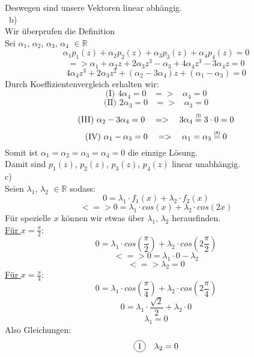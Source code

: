 \documentclass[11pt]{article}
\newcommand\myeqi{\mathrel{\overset{\makebox[0pt]{\mbox{\normalfont\tiny\sffamily (I)}}}{=}}}
\newcommand\myeqii{\mathrel{\overset{\makebox[0pt]{\mbox{\normalfont\tiny\sffamily (II)}}}{=}}}
\newcommand*\circled[1]{\tikz[baseline=(char.base)]{
            \node[shape=circle,draw,inner sep=2pt] (char) {#1};}}
\begin{document}
				Deswegen sind unsere Vektoren linear abhängig.\\\
			\indent b)\\
					Wir überprufen die Definition\\
					Sei $\alpha_1$, $\alpha_2$, $\alpha_3$, $\alpha_4$ $\in \mathbb{R}$\\
					$$\alpha_1 p_1(z)+\alpha_2 p_2(z)+\alpha_3 p_3(z)+\alpha_4 p_4(z)=0$$
					$$=>\alpha_1+\alpha_2z+2\alpha_3z^3-\alpha_3+4\alpha_4z^3-3\alpha_4z=0$$
					$$4\alpha_4z^3+2\alpha_3z^2+(\alpha_2-3\alpha_4)z+(\alpha_1-\alpha_3)=0$$
					Durch Koeffizientenvergleich erhalten wir:\\
					$$\text{(I) }4\alpha_4=0 \hspace{10pt} => \hspace{10pt} \alpha_4=0$$
					$$\text{(II) }2\alpha_3=0 \hspace{10pt} => \hspace{10pt} \alpha_3=0$$
					$$\text{(III) }\alpha_2-3\alpha_4=0 \hspace{10pt} => \hspace{10pt} 3\alpha_4 \myeqi 3\cdot 0=0$$
					$$\text{(IV) }\alpha_1-\alpha_3=0 \hspace{10pt} => \hspace{10pt} \alpha_1=\alpha_3 \myeqii 0$$
					Somit ist $\alpha_1=\alpha_2=\alpha_3=\alpha_4=0$ die einzige Lösung.\\
					Damit sind $p_1(z)$, $p_2(z)$, $p_3(z)$, $p_4(z)$ linear unabhängig.\\
				\indent c)\\
					Seien $\lambda_1$, $\lambda_2$ $\in \mathbb{R}$ sodass:\\
					$$0=\lambda_1 \cdot f_1(x)+\lambda_2 \cdot f_2(x)$$
					$$<=>0=\lambda_1 \cdot cos(x)+\lambda_2 \cdot cos(2x)$$
					Für spezielle $x$ können wir etwas über $\lambda_1$, $\lambda_2$ herausfinden.\\
					\underline{Für $x=\frac{\pi}{2}$}:\\
					$$0=\lambda_1 \cdot cos \left(\frac{\pi}{2}\right)+\lambda_2 \cdot cos\left(2\frac{\pi}{2}\right)$$
					$$<=>0=\lambda_1 \cdot 0 - \lambda_2$$
					$$<=>\lambda_2=0$$
					\underline{Für $x=\frac{\pi}{4}$}:\\
					$$0=\lambda_1 \cdot cos \left(\frac{\pi}{4}\right)+\lambda_2 \cdot cos\left(2\frac{\pi}{4}\right)$$
					$$0=\lambda_1 \cdot \frac{\sqrt{2}}{2}+\lambda_2 \cdot 0$$
					$$\lambda_1=0$$
					Also Gleichungen:\\
					$$\circled{1} \hspace{10pt} \lambda_2=0$$
\end{document}
